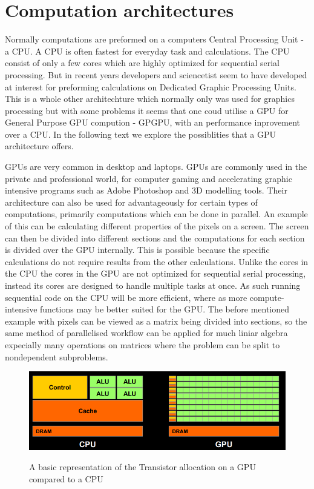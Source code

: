 \section{Computation architectures}
\label{sec:comparch}
Normally computations are preformed on a computers Central Processing Unit - a CPU.
A CPU is often fastest for everyday task and calculations.
The CPU consist of only a few cores which are highly optimized for sequential serial processing.\citep{whatisgpu}
But in recent years developers and sciencetist seem to have developed at interest for preforming calculations on Dedicated Graphic Processing Units.\citep{gpurise}
This is a whole other architechture which normally only was used for graphics processing but with some problems it seems that one coud utilise a GPU for General Purpose GPU compution - GPGPU, with an performance inprovement over a CPU.
In the following text we explore the possiblities that a GPU architecture offers.

GPUs are very common in desktop and laptops. \citep{STEAMHW}
GPUs are commonly used in the private and professional world, for computer gaming and accelerating graphic intensive programs such as Adobe Photoshop and 3D modelling tools. \citep{NVIDIAADOBE}
Their architecture can also be used for advantageously for certain types of computations, primarily computations which can be done in parallel. 
An example of this can be calculating different properties of the pixels on a screen. 
The screen can then be divided into different sections and the computations for each section is divided over the GPU internally.
This is possible because the specific calculations do not require results from the other calculations.
Unlike the cores in the CPU the cores in the GPU are not optimized for sequential serial processing, instead its cores are designed to handle multiple tasks at once. 
As such running sequential code on the CPU will be more efficient, where as more compute-intensive functions may be better suited for the GPU.\citep{NvidiaGPGPU}
The before mentioned example with pixels can be viewed as a matrix being divided into sections, so the same method of parallelised workflow can be applied for much liniar algebra expecially many operations on matrices where the problem can be split to nondependent subproblems.

\begin{figure}[h!]
\centering
 \includegraphics[width=1\textwidth]{figures/GPUCPUimage.png} %
\caption{A basic representation of the Transistor allocation on a GPU compared to a CPU}\label{image:GPUCPUimage}\citep{NvidiaCUDASeminar}
\vspace{-15pt}
\end{figure}

